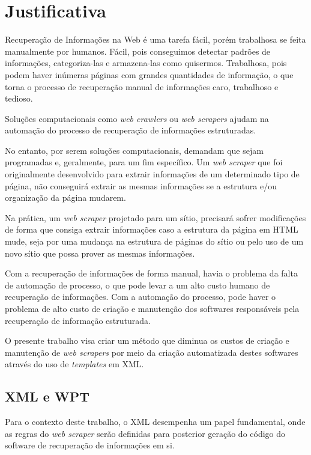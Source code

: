\chapter{Justificativa}
\thispagestyle{fancy}

Recuperação de Informações na Web é uma tarefa fácil, porém trabalhosa se feita manualmente por humanos. Fácil, pois conseguimos detectar padrões de informações, categoriza-las e armazena-las como quisermos. Trabalhosa, pois podem haver inúmeras páginas com grandes quantidades de informação, o que torna o processo de recuperação manual de informações caro, trabalhoso e tedioso.

Soluções computacionais como \emph{web crawlers} ou \emph{web scrapers} ajudam na automação do processo de recuperação de informações estruturadas. 

No entanto, por serem soluções computacionais, demandam que sejam programadas e, geralmente, para um fim específico. Um \emph{web scraper} que foi originalmente desenvolvido para extrair informações de um determinado tipo de página, não conseguirá extrair as mesmas informações se a estrutura e/ou organização da página mudarem.

Na prática, um \emph{web scraper} projetado para um sítio, precisará sofrer modificações de forma que consiga extrair informações caso a estrutura da página em HTML mude, seja por uma mudança na estrutura de páginas do sítio ou pelo uso de um novo sítio que possa prover as mesmas informações.

Com a recuperação de informações de forma manual, havia o problema da falta de automação de processo, o que pode levar a um alto custo humano de recuperação de informações. Com a automação do processo, pode haver o problema de alto custo de criação e manutenção dos softwares responsáveis pela recuperação de informação estruturada.

O presente trabalho visa criar um método que diminua os custos de criação e manutenção de \emph{web scrapers} por meio da criação automatizada destes softwares através do uso de \emph{templates} em XML.

\section{XML e WPT}

Para o contexto deste trabalho, o XML desempenha um papel fundamental, onde as regras do \emph{web scraper} serão definidas para posterior geração do código do software de recuperação de informações em si.

